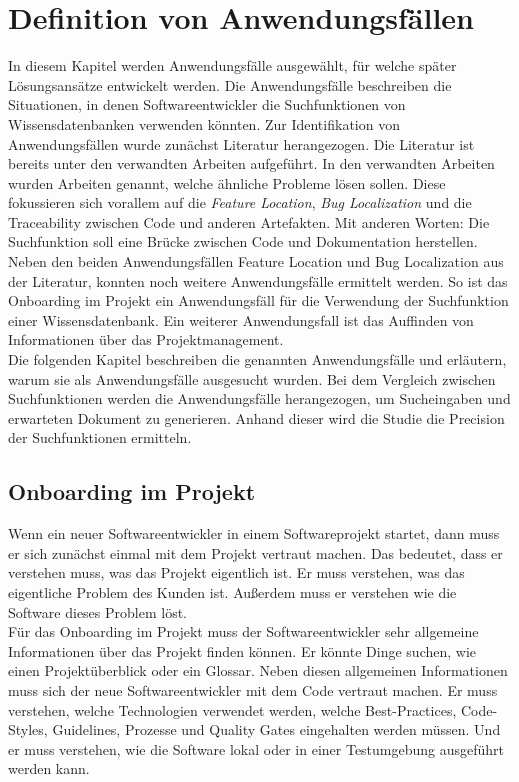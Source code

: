 \chapter{Definition von Anwendungsfällen}
In diesem Kapitel werden Anwendungsfälle ausgewählt, für welche später Lösungsansätze entwickelt werden.
Die Anwendungsfälle beschreiben die Situationen, in denen Softwareentwickler die Suchfunktionen von Wissensdatenbanken verwenden könnten.
Zur Identifikation von Anwendungsfällen wurde zunächst Literatur herangezogen.
Die Literatur ist bereits unter den verwandten Arbeiten aufgeführt.
In den verwandten Arbeiten wurden Arbeiten genannt, welche ähnliche Probleme lösen sollen.
Diese fokussieren sich vorallem auf die \textit{Feature Location}, \textit{Bug Localization} und die Traceability zwischen Code und anderen Artefakten.
Mit anderen Worten: Die Suchfunktion soll eine Brücke zwischen Code und Dokumentation herstellen.
Neben den beiden Anwendungsfällen Feature Location und Bug Localization aus der Literatur, konnten noch weitere Anwendungsfälle ermittelt werden.
So ist das Onboarding im Projekt ein Anwendungsfäll für die Verwendung der Suchfunktion einer Wissensdatenbank.
Ein weiterer Anwendungsfall ist das Auffinden von Informationen über das Projektmanagement.\\

Die folgenden Kapitel beschreiben die genannten Anwendungsfälle und erläutern, warum sie als Anwendungsfälle ausgesucht wurden.
Bei dem Vergleich zwischen Suchfunktionen werden die Anwendungsfälle herangezogen, um Sucheingaben und erwarteten Dokument zu generieren.
Anhand dieser wird die Studie die Precision der Suchfunktionen ermitteln.

\section{Onboarding im Projekt}
Wenn ein neuer Softwareentwickler in einem Softwareprojekt startet, dann muss er sich zunächst einmal mit dem Projekt vertraut machen.
Das bedeutet, dass er verstehen muss, was das Projekt eigentlich ist.
Er muss verstehen, was das eigentliche Problem des Kunden ist.
Außerdem muss er verstehen wie die Software dieses Problem löst.\\

Für das Onboarding im Projekt muss der Softwareentwickler sehr allgemeine Informationen über das Projekt finden können.
Er könnte Dinge suchen, wie einen Projektüberblick oder ein Glossar.
Neben diesen allgemeinen Informationen muss sich der neue Softwareentwickler mit dem Code vertraut machen.
Er muss verstehen, welche Technologien verwendet werden, welche Best-Practices, Code-Styles, Guidelines, Prozesse und Quality Gates eingehalten werden müssen.
Und er muss verstehen, wie die Software lokal oder in einer Testumgebung ausgeführt werden kann.\\

